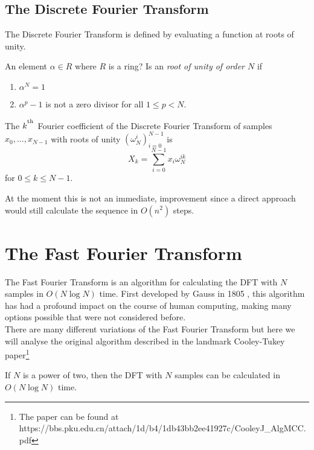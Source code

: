 \subsection{The Discrete Fourier Transform}

The Discrete Fourier Transform is defined by evaluating a function at roots of unity.
\begin{definition}
  An element $\alpha \in R$ where $R$ is a ring? Is an \emph{root of unity of order $N$} if
  \begin{enumerate}
    \item $\alpha^N = 1$
    \item $\alpha^p - 1$ is not a zero divisor for all $1 \leq p < N$.
  \end{enumerate}
\end{definition}


\begin{definition}
The $k^{\textsuperscript{\textup{th}}}$ Fourier coefficient of the Discrete Fourier Transform of samples $x_0, \ldots, x_{N-1}$ with roots of unity $(\omega_N^i)_{i=0}^{N-1}$ is 
\[
    X_k = \sum^{N-1}_{i=0}x_i\omega_{N}^{ik}
\]
for $0 \leq k \leq N-1$.\\
\end{definition}

At the moment this is not an immediate, improvement since a direct approach would still calculate the sequence in $O(n^2)$ steps.


\section{The Fast Fourier Transform}

The Fast Fourier Transform is an algorithm for calculating the DFT with $N$ samples in $O(N \log N)$ time. First developed by Gauss in 1805 \cite{guass}, this algorithm has had a profound impact on the course of human computing, making many options possible that were not considered before.\\
There are many different variations of the Fast Fourier Transform but here we will analyse the original algorithm described in the landmark Cooley-Tukey paper\footnote{The paper can be found at https://bbs.pku.edu.cn/attach/1d/b4/1db43bb2ee41927c/CooleyJ\_AlgMCC.pdf}\\

\begin{theorem}
    If $N$ is a power of two, then the DFT with $N$ samples can be calculated in $O(N\log N)$ time.
\end{theorem}

